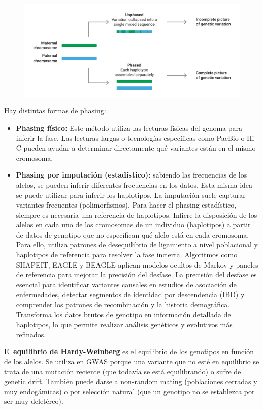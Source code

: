 \begin{figure}[htbp]
\centering
\includegraphics[width = \textwidth]{figs/Imagen1.png}
\end{figure}

Hay distintas formas de phasing:
\begin{itemize}
\item \textbf{Phasing físico:} Este método utiliza las lecturas físicas del genoma para inferir la fase. Las lecturas largas o tecnologías específicas como PacBio o Hi-C pueden ayudar a determinar directamente qué variantes están en el mismo cromosoma.

\item \textbf{Phasing por imputación (estadístico):} sabiendo las frecuencias de los alelos, se pueden inferir diferentes frecuencias en los datos. Esta misma idea se puede utilizar para inferir los haplotipos. La imputación suele capturar variantes frecuentes (polimorfismos). Para hacer el phasing estadístico, siempre es necesaria una referencia de haplotipos. Infiere la disposición de los alelos en cada uno de los cromosomas de un individuo (haplotipos) a partir de datos de genotipo que no especifican qué alelo está en cada cromosoma. Para ello, utiliza patrones de desequilibrio de ligamiento a nivel poblacional y haplotipos de referencia para resolver la fase incierta. Algoritmos como SHAPEIT, EAGLE y BEAGLE aplican modelos ocultos de Markov y paneles de referencia para mejorar la precisión del desfase. La precisión del desfase es esencial para identificar variantes causales en estudios de asociación de enfermedades, detectar segmentos de identidad por descendencia (IBD) y comprender los patrones de recombinación y la historia demográfica. Transforma los datos brutos de genotipo en información detallada de haplotipos, lo que permite realizar análisis genéticos y evolutivos más refinados.
\end{itemize}

El \textbf{equilibrio de Hardy-Weinberg} es el equilibrio de los genotipos en función de los alelos. Se utiliza en GWAS porque una variante que no esté en equilibrio se trata de una mutación reciente (que todavía se está equilibrando) o sufre de genetic drift. También puede darse a non-random mating (poblaciones cerradas y muy endogámicas) o por selección natural (que un genotipo no se establezca por ser muy deletéreo).

